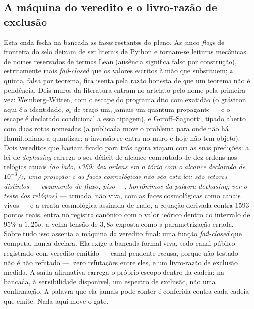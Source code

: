 \documentclass[11pt]{article}
\theoremstyle{definition}\newtheorem{deriv}{Derivação}
\begin{document}
\subsection*{A m\'aquina do veredito e o livro-raz\~ao de exclus\~ao}Esta onda fecha na bancada as fases restantes do plano. As cinco \emph{flags} de fronteira do selo deixam de ser literais de Python e tornam-se leituras mec\^anicas de nomes reservados de termos Lean (aus\^encia significa falso por constru\c{c}\~ao), estritamente mais \emph{fail-closed} que os valores escritos \`a m\~ao que substituem; a quinta, falsa por teorema, fica isenta pela raz\~ao honesta de que um teorema n\~ao \'e pend\^encia. Dois muros da literatura entram no artefato pelo nome pela primeira vez: Weinberg--Witten, com o escape do programa dito com exatid\~ao (o gr\'aviton aqui \'e a identidade, $\rho_\ast$ de tra\c{c}o um, jamais um quantum propagante --- e o escape \'e declarado condicional a essa tipagem), e Goroff--Sagnotti, tipado aberto com duas rotas nomeadas (a publicada move o problema para onde n\~ao h\'a Hamiltoniano a quantizar; a invers\~ao re-entra no muro e hoje n\~ao tem objeto). Dois vereditos que haviam ficado para tr\'as agora viajam com as suas predi\c{c}\~oes: a lei de \emph{dephasing} carrega o seu d\'eficit de alcance computado de dez ordens nos rel\'ogios atuais \emph{(ao lado, v369: dez ordens era o t\'orio com o alcance declarado de $10^{-3}$/s, uma proje\c{c}\~ao; e as faces cosmol\'ogicas n\~ao s\~ao esta lei: s\~ao setores distintos --- vazamento de fluxo, piso ---, hom\^onimos da palavra \emph{dephasing}; ver o teste dos rel\'ogios)} --- armada, n\~ao viva, com as faces cosmol\'ogicas como canais vivos --- e a errata cosmol\'ogica assinada de maio, a equa\c{c}\~ao derivada contra 1593 pontos reais, entra no registro can\^onico com o valor te\'orico dentro do intervalo de 95\% a $1{,}25\sigma$, a velha tens\~ao de $3{,}8\sigma$ exposta como a parametriza\c{c}\~ao errada. Sobre tudo isso assenta a m\'aquina do veredito final: uma fun\c{c}\~ao \emph{fail-closed} que computa, nunca declara. Ela exige a bancada formal viva, todo canal p\'ublico registrado com veredito emitido --- canal pendente recusa, porque n\~ao testado n\~ao \'e n\~ao refutado ---, zero refuta\c{c}\~oes entre eles, e um livro-raz\~ao de exclus\~ao medido. A sa\'\i{}da afirmativa carrega o pr\'oprio escopo dentro da cadeia: na bancada, \`a sensibilidade dispon\'\i{}vel, um espectro de exclus\~ao, n\~ao uma confirma\c{c}\~ao. A palavra que ela jamais pode conter \'e conferida contra cada cadeia que emite. Nada aqui move o gate.
\end{document}
